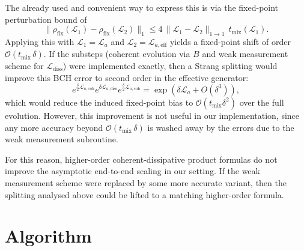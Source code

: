 The already used and convenient way to express this is via the fixed-point perturbation bound of \cite[Lemma II.1]{chen2023quantum}  
\begin{equation}
        \|\rho_{\mathrm{fix}}(\mathcal L_1)-\rho_{\mathrm{fix}}(\mathcal L_2)\|_1
    \le 4\, \|\mathcal L_1-\mathcal L_2\|_{1\to1}\, t_{\mathrm{mix}}(\mathcal L_1).
\end{equation}
Applying this with $\mathcal L_1=\mathcal L_a$ and $\mathcal L_2=\mathcal L_{a,\mathrm{eff}}$ yields a fixed-point shift of order $\mathcal O\left(t_\text{mix}\, \delta\right)$. If the substeps (coherent evolution via $B$ and weak measurement scheme for $\mathcal{L}_\text{diss}$) were implemented exactly, then a Strang splitting would improve this BCH error to second order in the effective generator:
\begin{equation}
    e^{\frac{\delta}{2}\mathcal L_{a,\mathrm{coh}}}
    e^{\delta \mathcal L_{a,\mathrm{diss}}}
    e^{\frac{\delta}{2}\mathcal L_{a,\mathrm{coh}}}
    = \exp\!\left(\delta \mathcal L_a + O(\delta^3)\right),
\end{equation}
which would reduce the induced fixed-point bias to $\mathcal O(t_{\mathrm{mix}}\delta^2)$ over the full evolution. However, this improvement is not useful in our implementation, since any more accuracy beyond $\mathcal O\left(t_\text{mix}\, \delta\right)$ is washed away by the errors due to the weak measurement subroutine. 

For this reason, higher-order coherent-dissipative product formulas do not improve the asymptotic end-to-end scaling in our setting. If the weak measurement scheme were replaced by some more accurate variant, then the splitting analysed above could be lifted to a matching higher-order formula.

\smallskip
\label{sec:algorithm}
\section{Algorithm}

